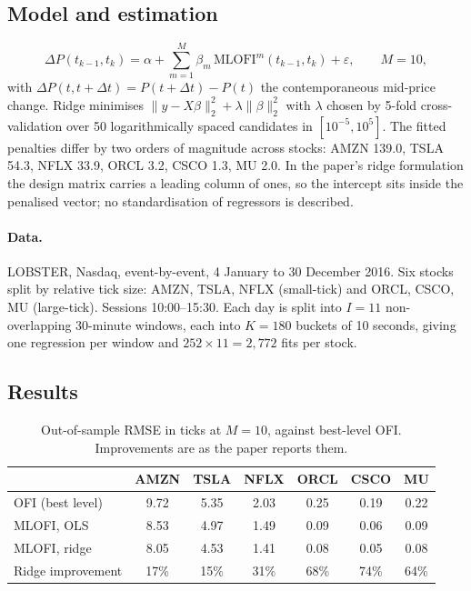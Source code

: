 \documentclass[11pt]{article}
\begin{document}
\subsection{Model and estimation}

\begin{equation}
\Delta P(t_{k-1},t_k)=\alpha+\sum_{m=1}^{M}\beta_m\,\mathrm{MLOFI}^m(t_{k-1},t_k)+\varepsilon,
\qquad M=10,
\end{equation}
with $\Delta P(t,t+\Delta t)=P(t+\Delta t)-P(t)$ the contemporaneous mid-price
change. Ridge minimises $\lVert y-X\beta\rVert_2^2+\lambda\lVert\beta\rVert_2^2$
with $\lambda$ chosen by 5-fold cross-validation over 50 logarithmically spaced
candidates in $[10^{-5},10^{5}]$. The fitted penalties differ by two orders of
magnitude across stocks: AMZN 139.0, TSLA 54.3, NFLX 33.9, ORCL 3.2, CSCO 1.3,
MU 2.0. In the paper's ridge formulation the design matrix carries a leading
column of ones, so the intercept sits inside the penalised vector; no
standardisation of regressors is described.

\paragraph{Data.} LOBSTER, Nasdaq, event-by-event, 4 January to 30 December
2016. Six stocks split by relative tick size: AMZN, TSLA, NFLX (small-tick) and
ORCL, CSCO, MU (large-tick). Sessions 10:00--15:30. Each day is split into
$I=11$ non-overlapping 30-minute windows, each into $K=180$ buckets of 10
seconds, giving one regression per window and $252\times 11=2{,}772$ fits per
stock.

\subsection{Results}

\begin{table}[h]
\centering
\captionsetup{font=small}
\caption{Out-of-sample RMSE in ticks at $M=10$, against best-level OFI.
Improvements are as the paper reports them.}
\small
\begin{tabular}{lcccccc}
\toprule
& AMZN & TSLA & NFLX & ORCL & CSCO & MU \\
\midrule
OFI (best level) & 9.72 & 5.35 & 2.03 & 0.25 & 0.19 & 0.22 \\
MLOFI, OLS       & 8.53 & 4.97 & 1.49 & 0.09 & 0.06 & 0.09 \\
MLOFI, ridge     & 8.05 & 4.53 & 1.41 & 0.08 & 0.05 & 0.08 \\
\midrule
Ridge improvement & 17\% & 15\% & 31\% & 68\% & 74\% & 64\% \\
\bottomrule
\end{tabular}
\end{table}
\end{document}
